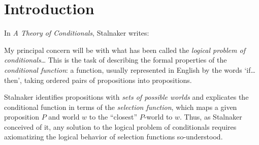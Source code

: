 \documentclass[12pt]{article}
\begin{document}

\section{Introduction}
\label{Section:Introduction}

In \emph{A Theory of Conditionals}, Stalnaker writes:
\begin{displayquote}
    My principal concern will be with what has been called the \emph{logical problem of conditionals}\dots 
    This is the task of describing the formal properties of the \emph{conditional function}: a function, usually represented in English by the words `if\dots then', taking ordered pairs of propositions into propositions.
\end{displayquote}
Stalnaker identifies propositions with \emph{sets of possible worlds} and explicates the conditional function in terms of the \emph{selection function}, which maps a given proposition $P$ and world $w$ to the ``closest'' $P$-world to $w$. 
Thus, as Stalnaker conceived of it, any solution to the logical problem of conditionals requires axiomatizing the logical behavior of selection functions so-understood.
\end{document}

